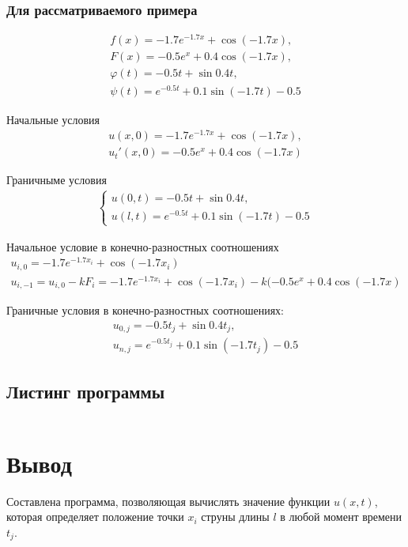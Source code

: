 \subsubsection*{Для рассматриваемого примера}

\begin{align}
	f(x) = -1.7 e^{-1.7 x} + \cos(-1.7 x), \\
	F(x) = -0.5 e^x + 0.4 \cos(-1.7 x),    \\
	\varphi(t) = -0.5 t + \sin{0.4 t},     \\
	\psi(t) = e^{-0.5 t} + 0.1 \sin(-1.7 t) - 0.5
\end{align}

Начальные  условия
\begin{align}
	u(x, 0) = -1.7 e^{-1.7 x} + \cos(-1.7 x), \\
	u_t'(x, 0)= -0.5 e^x + 0.4 \cos(-1.7 x)
\end{align}

Граничныме условия
\begin{align}
	\begin{cases}
		u(0,t) = -0.5 t + \sin{0.4 t}, \\
		u(l,t) = e^{-0.5 t} + 0.1 \sin(-1.7 t) - 0.5
	\end{cases}
\end{align}

Начальное условие в конечно-разностных соотношениях
\begin{align}
	u_{i,0} = -1.7 e^{-1.7 x_i} + \cos(-1.7 x_i) \\
	u_{i,-1} = u_{i,0} - k F_i = -1.7 e^{-1.7 x_i} + \cos(-1.7 x_i) - k (-0.5 e^x + 0.4 \cos(-1.7 x)
\end{align}

Граничные условия в конечно-разностных соотношениях:
\begin{align}
	u_{0,j} = -0.5 t_j + \sin{0.4 t_j}, \\
	u_{n,j} = e^{-0.5 t_j} + 0.1 \sin(-1.7 t_j) - 0.5
\end{align}

\subsection{Листинг программы}
\inputminted[frame=lines, linenos]{cpp}{listings/main.cc}



\section{Вывод}
Составлена программа, позволяющая вычислять значение функции \(u(x,t)\), которая определяет положение точки \(x_i\) струны длины \(l\) в любой момент времени \(t_j\).

